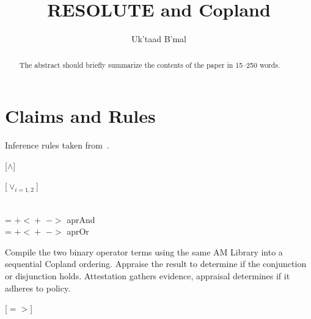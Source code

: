 \documentclass[runningheads]{llncs}
\theoremstyle{definition}
\begin{document}
%
\title{RESOLUTE and Copland%
}
%
%
\author{Uk'taad B'mal}
%
%
%
\maketitle              %
%
\begin{abstract}
The abstract should briefly summarize the contents of the paper in
15--250 words.

\end{abstract}
%
%
%



\section{Claims and Rules}

Inference rules taken from~\citet{gacek2014resolute}.

[$\wedge$]

[$\vee_{i=1,2}$]

\begin{definition} \\
   =  $\mathsf{+\!<\!+}$
   $->$ aprAnd \\
   =  $\mathsf{+\!<\!+}$
   $->$ aprOr
\end{definition}

Compile the two binary operator terms using the same AM Library into a
sequential Copland ordering.  Appraise the result to determine if the
conjunction or disjunction holds.  Attestation gathers evidence,
appraisal determines if it adheres to policy.

[$=>$]
\end{document}
